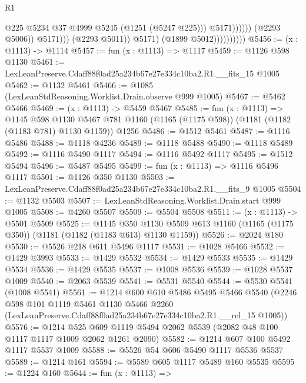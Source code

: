 \begin{lexlean}{R1}
\begin{coremodule}
                                                @225
                                                @5234
                                                @37
                                                @4999
                                                @5245
                                                (@1251 (@5247 @225)))
                                              @5171))))))
                                  (@2293 @5006))
                                @5171)))
                          (@2293 @5011))
                        @5171)
                      (@1899 @5012))))))))))
@5456 := (x : @1113) -> @1114
@5457 := fun (x : @1113) => @1117
@5459 := @1126 @598 @1130
@5461 := LexLeanPreserve.Cdaff88f0ad25a234b67e27e334c10ba2.R1.__fits_15 @1005
@5462 := @1132 @5461
@5466 := @1085 (LexLeanStdReasoning.Worklist.Drain.observe @999 @1005)
@5467 := @5462 @5466
@5469 := (x : @1113) -> @5459 @5467
@5485 := fun (x : @1113) =>
  @1145
    @598
    @1130
    @5467
    @781
    @1160
    (@1165 (@1175 @598))
    (@1181 (@1182 (@1183 @781) @1130 @1159))
    @1256
@5486 := @1512 @5461
@5487 := @1116 @5486
@5488 := @1118 @4236
@5489 := @1118 @5488
@5490 := @1118 @5489
@5492 := @1116 @5490 @1117
@5494 := @1116 @5492 @1117
@5495 := @1512 @5494
@5496 := @5487 @5495
@5499 := fun (x : @1113) => @1116 @5496 @1117
@5501 := @1126 @350 @1130
@5503 := LexLeanPreserve.Cdaff88f0ad25a234b67e27e334c10ba2.R1.__fits_9 @1005
@5504 := @1132 @5503
@5507 := LexLeanStdReasoning.Worklist.Drain.start @999 @1005
@5508 := @4260 @5507
@5509 := @5504 @5508
@5511 := (x : @1113) -> @5501 @5509
@5525 := @1145
    @350
    @1130
    @5509
    @613
    @1160
    (@1165 (@1175 @350))
    (@1181 (@1182 (@1183 @613) @1130 @1159))
@5526 := @2024 @180
@5530 := @5526 @218 @611 @5496 @1117
@5531 := @1028 @5466
@5532 := @1429 @3993
@5533 := @1429 @5532
@5534 := @1429 @5533
@5535 := @1429 @5534
@5536 := @1429 @5535
@5537 := @1008 @5536
@5539 := @1028 @5537 @1009
@5540 := @2063 @5539
@5541 := @5531 @5540
@5544 := @5530 @5541 (@1008 @5541)
@5561 := @1214
    @600
    @610
    @5486
    @5495
    @5466
    @5540
    (@2246
      @598
      @101
      @1119
      @5461
      @1130
      @5466
      @2260
      (LexLeanPreserve.Cdaff88f0ad25a234b67e27e334c10ba2.R1.__rel_15 @1005))
@5576 := @1214
    @525
    @609
    @1119
    @5494
    @2062
    @5539
    (@2082 @48 @100 @1117 @1117 @1009 @2062 @1261 @2090)
@5582 := @1214 @607 @100 @5492 @1117 @5537 @1009
@5588 := @5526 @54 @606 @5490 @1117 @5536 @5537
@5589 := @1214 @161
@5594 := @5589 @605 @1117 @5489 @160 @5535
@5595 := @1224 @160
@5644 := fun (x : @1113) =>

\end{coremodule}
\end{lexlean}
